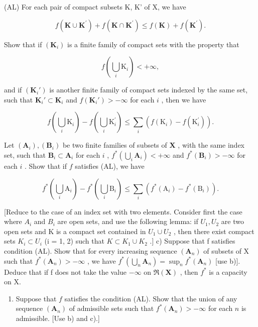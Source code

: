 (AL) For each pair of compact subsets K, K' of X, we have

\[
f (\mathbf {K} \cup \mathbf {K} ^ {\prime}) + f (\mathbf {K} \cap \mathbf {K} ^ {\prime}) \leqslant f (\mathbf {K}) + f (\mathbf {K} ^ {\prime}).
\]

Show that if \((\mathbf{K}_i)\) is a finite family of compact sets with the property that

\[
f \left(\bigcup_ {i} \mathrm{K} _ {i}\right) <   + \infty ,
\]

and if \((\mathbf{K}_i')\) is another finite family of compact sets indexed by the same set, such that \(\mathbf{K}_i' \subset \mathbf{K}_i\) and \(f(\mathbf{K}_i') > -\infty\) for each \(i\) , then we have

\[
f \left(\bigcup_ {i} \mathrm{K} _ {i}\right) - f \left(\bigcup_ {i} \mathrm{K} _ {i} ^ {\prime}\right) \leqslant \sum_ {i} \left(f \left(\mathrm{K} _ {i}\right) - f \left(\mathrm{K} _ {i} ^ {\prime}\right)\right).
\]

Let \((\mathbf{A}_i), (\mathbf{B}_i)\) be two finite families of subsets of \(\mathbf{X}\) , with the same index set, such that \(\mathbf{B}_i \subset \mathbf{A}_i\) for each \(i\) , \(f^* \left( \bigcup_i \mathbf{A}_i \right) < +\infty\) and \(f^*(\mathbf{B}_i) > -\infty\) for each \(i\) . Show that if \(f\) satisfies (AL), we have

\[
f ^ {*} \left(\bigcup_ {i} \mathrm{A} _ {i}\right) - f ^ {*} \left(\bigcup_ {i} \mathrm{B} _ {i}\right) \leqslant \sum_ {i} \left(f ^ {*} (\mathrm{A} _ {i}) - f ^ {*} (\mathrm{B} _ {i})\right).
\]

{[}Reduce to the case of an index set with two elements. Consider first the case where \(A_{i}\) and \(B_{i}\) are open sets, and use the following lemma: if \(U_{1}, U_{2}\) are two open sets and K is a compact set contained in \(U_{1} \cup U_{2}\) , then there exist compact sets \(K_{i} \subset U_{i}\) (i = 1, 2) such that \(K \subset K_{1} \cup K_{2}\) .{]} c) Suppose that f satisfies condition (AL). Show that for every increasing sequence \((\mathbf{A}_{n})\) of subsets of X such that \(f^{*}(\mathbf{A}_{n}) > -\infty\) , we have \(f^{*}\left(\bigcup_{n} \mathbf{A}_{n}\right) = \sup_{n} f^{*}(\mathbf{A}_{n})\) {[}use b){]}. Deduce that if f does not take the value \(-\infty\) on \(\Re(\mathbf{X})\) , then \(f^{*}\) is a capacity on X.

\begin{enumerate}
\def\labelenumi{\alph{enumi})}
\setcounter{enumi}{3}
\tightlist
\item
  Suppose that \(f\) satisfies the condition (AL). Show that the union of any sequence \((\mathbf{A}_n)\) of admissible sets such that \(f^*(\mathbf{A}_n) > -\infty\) for each \(n\) is admissible. {[}Use b) and c).{]}
\end{enumerate}


